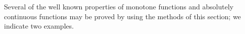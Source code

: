 Several of the well known properties of monotone functions and absolutely continuous functions may be proved by using the methods of this section; we indicate two examples.
